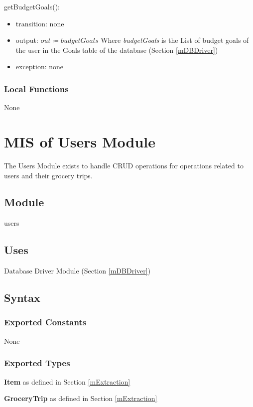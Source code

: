 \documentclass[12pt, titlepage]{article}
\begin{document}
\noindent getBudgetGoals():
\begin{itemize}
\item transition: none
\item output: \( \textit{out} \coloneqq budgetGoals \) Where \textit{budgetGoals} is the List of budget goals of the user in the Goals table of the database (Section \ref{mDBDriver})
\item exception: none
\end{itemize}


\subsubsection{Local Functions}
None

\newpage

\section{MIS of Users Module} \label{mUsers} 
The Users Module exists to handle CRUD operations for operations related to users and their grocery trips.

\subsection{Module}

users

\subsection{Uses}

Database Driver Module (Section \ref{mDBDriver}) 

\subsection{Syntax}

\subsubsection{Exported Constants}
None

\subsubsection{Exported Types}
\textbf{Item} as defined in Section \ref{mExtraction} 

\noindent \textbf{GroceryTrip} as defined in Section \ref{mExtraction} \\
\end{document}
